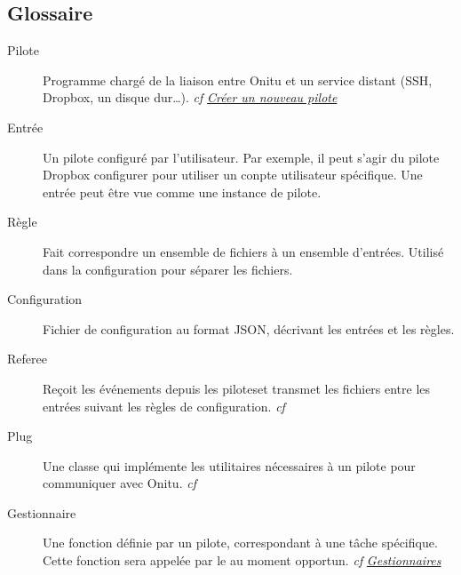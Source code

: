 \documentclass[letterpaper,10pt,english]{sphinxmanual}
\begin{document}
\subsection{Glossaire}
\label{intro:glossary}\begin{description}
\item[{Pilote}] \leavevmode{}\label{intro:term-driver}
Programme chargé de la liaison entre Onitu et un service distant (SSH, Dropbox, un disque dur…). \emph{cf} {\hyperref[drivers::doc]{\emph{Créer un nouveau pilote}}}

\item[{Entrée}] \leavevmode{}\label{intro:term-entry}
Un pilote configuré par l'utilisateur. Par exemple, il peut s'agir du pilote Dropbox configurer pour utiliser un conpte utilisateur spécifique. Une entrée peut être vue comme une instance de pilote.

\item[{Règle}] \leavevmode{}\label{intro:term-rule}
Fait correspondre un ensemble de fichiers à un ensemble d'entrées. Utilisé dans la configuration pour séparer les fichiers.

\item[{Configuration}] \leavevmode{}\label{intro:term-setup}
Fichier de configuration au format JSON, décrivant les entrées et les règles.

\item[{Referee}] \leavevmode{}\label{intro:term-referee}
Reçoit les événements depuis les piloteset transmet les fichiers entre les entrées suivant les règles de configuration. \emph{cf} {\hyperref[components:onitu.referee.Referee]{}}

\item[{Plug}] \leavevmode{}\label{intro:term-plug}
Une classe qui implémente les utilitaires nécessaires à un pilote pour communiquer avec Onitu. \emph{cf} {\hyperref[drivers:onitu.api.Plug]{}}

\item[{Gestionnaire}] \leavevmode{}\label{intro:term-handler}
Une fonction définie par un pilote, correspondant à une tâche spécifique. Cette fonction sera appelée par le {\hyperref[drivers:onitu.api.Plug]{}} au moment opportun. \emph{cf} {\hyperref[drivers:handlers]{\emph{Gestionnaires}}}

\end{description}
\end{document}

